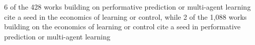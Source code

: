 6 of the 428 works building on performative prediction or multi-agent learning cite a seed in the economics of learning or control, while 2 of the 1,088 works building on the economics of learning or control cite a seed in performative prediction or multi-agent learning